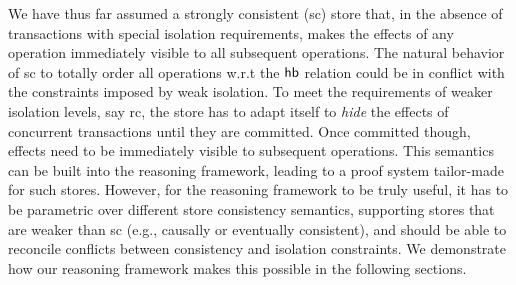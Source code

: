 We have thus far assumed a strongly consistent ({\sc sc}) store that,
in the absence of transactions with special isolation requirements,
makes the effects of any operation immediately visible to all
subsequent operations. The natural behavior of {\sc sc} to totally
order all operations w.r.t the $\textsf{hb}$ relation could be in conflict
with the constraints imposed by weak isolation. To meet the
requirements of weaker isolation levels, say {\sc rc}, the store has
to adapt itself to \emph{hide} the effects of concurrent transactions
until they are committed. Once committed though, effects need to be
immediately visible to subsequent operations. This semantics can be
built into the reasoning framework, leading to a proof system
tailor-made for such stores. However, for the reasoning framework to
be truly useful, it has to be parametric over different store
consistency semantics, supporting stores that are weaker than {\sc sc}
(e.g., causally or eventually consistent), and should be able to
reconcile conflicts between consistency and isolation constraints.  We
demonstrate how our reasoning framework makes this possible in the
following sections.
